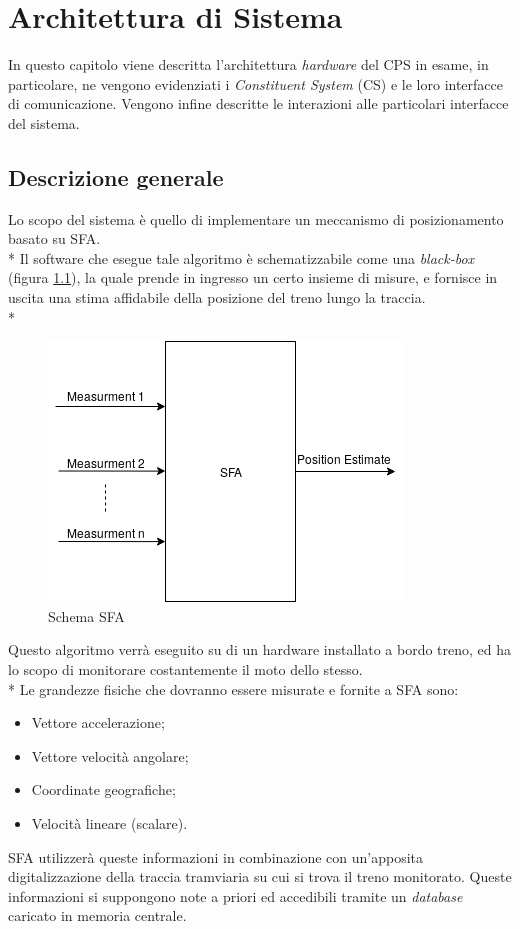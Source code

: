 \chapter{Architettura di Sistema}
In questo capitolo viene descritta l'architettura \emph{hardware} del CPS in esame, in particolare, ne vengono evidenziati i \emph{Constituent System} (CS) e le loro interfacce di comunicazione. Vengono infine descritte le interazioni alle particolari interfacce del sistema.
\section{Descrizione generale}
Lo scopo del sistema \`e quello di implementare un meccanismo di posizionamento basato su SFA.\cite{sfarailway}\\*
Il software che esegue tale algoritmo \`e schematizzabile come una \emph{black-box} (figura \ref{fig:sfa}), la quale prende in ingresso un certo insieme di misure, e fornisce in uscita una stima affidabile della posizione del treno lungo la traccia.\\*
\begin{figure}[h]
	\centering
	\includegraphics[scale=0.75]{img/sfaschema}
	\caption{Schema SFA}
	\label{fig:sfa}
\end{figure}
\clearpage
Questo algoritmo verr\`a eseguito su di un hardware installato a bordo treno, ed ha lo scopo di monitorare costantemente il moto dello stesso.\\*
Le grandezze fisiche che dovranno essere misurate e fornite a SFA sono:
\begin{itemize}
	\item Vettore accelerazione;
	\item Vettore velocit\`a angolare;
	\item Coordinate geografiche;
	\item Velocit\`a lineare (scalare).
\end{itemize}
SFA utilizzer\`a queste informazioni in combinazione con un'apposita digitalizzazione della traccia tramviaria su cui si trova il treno monitorato. Queste informazioni si suppongono note a priori ed accedibili tramite un \emph{database} caricato in memoria centrale.
